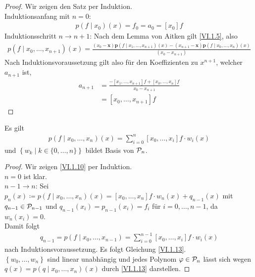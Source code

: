\begin{proof}
  Wir zeigen den Satz per Induktion.\\
  Induktionsanfang mit $n=0$:
  \begin{gather*}
    p(f\mid x_0) (x) = f_0 = a_0 = [x_0]f
  \end{gather*}
  Induktionsschritt $n \rightarrow n+1$:
  Nach dem Lemma von Aitken gilt \eqref{VI.1.5}, also 
  \begin{gather*}
    p(f\mid x_0, \dots, x_{n+1}) (x) 
    = \frac{(x_0-{\boldsymbol x}){\boldsymbol p}(f\mid x_1,\dots, x_{n+1})(x) -
      (x_{n+1}-{\boldsymbol x}){\boldsymbol p}(f\mid x_0,\dots, x_{n})(x)}
    {(x_0-x_{n+1})}
  \end{gather*}
  Nach Induktionsvoraussetzung gilt also 
  für den Koeffizienten zu  $x^{n+1}$, welcher $a_{n+1}$ ist,
  \begin{align*}
    a_{n+1} &= \frac{-[x_1,\dots, x_{n+1}]f+[x_0,\dots,x_n]f}
              {x_0-x_{n+1}}\\
            & = [x_0, \dots , x_{n+1}] f
  \end{align*}
\end{proof}


\begin{Satze}\label{6.1.7}
  Es gilt 
  \begin{gather}
    p(f\mid  x_0, \dots , x_n)(x) 
    = \sum_{i=0}^{n}[x_0,\dots, x_i]f\cdot w_i(x)
    \label{VI.1.13}
  \end{gather}
  und $\left\{w_k\middle\vert k\in \{0,\dots,n\}\right\}$
  bildet Basis von $\mathcal{P}_n$.
\end{Satze}

\begin{proof}
  Wir zeigen \eqref{VI.1.10} per Induktion.\\
  $n=0$ ist klar.\\
  $n-1\rightarrow n$: Sei $p_n(x)\coloneqq p(f\mid  x_0,\dots,x_n)(x)
  = [x_0,\dots, x_n]f \cdot w_n(x) + q_{n-1}(x)$ mit
  $q_{n-1}\in\mathcal{P}_{n-1}$ und $q_{n-1}(x_i)=p_{n-1}(x_i)=f_i$
  für $i=0,\dots ,n-1$, da $w_n(x_i)=0$.\\
  Damit folgt
  \begin{gather*}
    q_{n-1} = p(f\mid x_0, \dots, x_{n-1})
    =\sum_{i=0}^{n-1}[x_0,\dots, x_i]f\cdot w_i(x)
  \end{gather*}
  nach Induktionsvoraussetzung. 
  Es folgt Gleichung  \eqref{VI.1.13}.\\
  $\left\{w_0, \dots,w_n\right\}$ sind linear unabhängig
  und jedes Polynom $\varphi\in\mathcal{P}_n$
  lässt sich wegen $q(x)=p(q\mid x_0,\dots,x_n)(x)$
  durch \eqref{VI.1.13} darstellen.
\end{proof}

